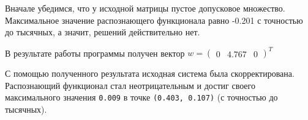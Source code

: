 Вначале убедимся, что у исходной матрицы пустое допусковое множество. Максимальное значение распознающего функционала равно -0.201 с точностью до тысячных, а значит, решений действительно нет.

В результате работы  программы получен вектор $w=\begin{pmatrix}
0 & 4.767 & 0
\end{pmatrix}^T
$

С помощью полученного результата исходная система была скорректирована. Распознающий функционал стал неотрицательным и достиг своего максимального значения \texttt{0.009} в точке \texttt{(0.403, 0.107)} (с точностью до тысячных).